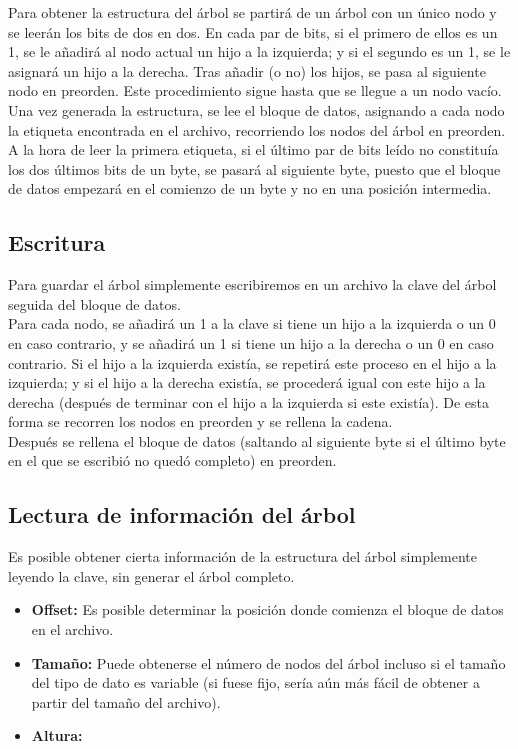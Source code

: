 \documentclass{article}
\begin{document}
Para obtener la estructura del árbol se partirá de un árbol con un único nodo y se 
leerán los bits de dos en dos. En cada par de bits, si el primero de ellos es un
1, se le añadirá al nodo actual un hijo a la izquierda; y si el segundo es un 1,
se le asignará un hijo a la derecha. Tras añadir (o no) los hijos, se pasa al
siguiente nodo en preorden. Este procedimiento sigue hasta que se llegue a un nodo
vacío. \\

Una vez generada la estructura, se lee el bloque de datos, asignando a cada nodo la
etiqueta encontrada en el archivo, recorriendo los nodos del árbol en preorden. A
la hora de leer la primera etiqueta, si el último par de bits leído no constituía 
los dos últimos bits de un byte, se pasará al siguiente byte, puesto que el bloque 
de datos empezará en el comienzo de un byte y no en una posición intermedia.

\subsection{Escritura}

Para guardar el árbol simplemente escribiremos en un archivo la clave del árbol 
seguida del bloque de datos. \\

Para cada nodo, se añadirá un 1 a la clave si tiene un hijo a la izquierda o un 0
en caso contrario, y se añadirá un 1 si tiene un hijo a la derecha o un 0 en caso 
contrario. Si el hijo a la izquierda existía, se repetirá este proceso en el hijo
a la izquierda; y si el hijo a la derecha existía, se procederá igual con este hijo
a la derecha (después de terminar con el hijo a la izquierda si este existía). De
esta forma se recorren los nodos en preorden y se rellena la cadena. \\

Después se rellena el bloque de datos (saltando al siguiente byte si el último 
byte en el que se escribió no quedó completo) en preorden.

\subsection{Lectura de información del árbol}

Es posible obtener cierta información de la estructura del árbol simplemente 
leyendo la clave, sin generar el árbol completo.

\begin{itemize}
	\item \textbf{Offset:} Es posible determinar la posición donde comienza el 
	bloque de datos en el archivo. %
	\item \textbf{Tamaño:} Puede obtenerse el número de nodos del árbol incluso
	si el tamaño del tipo de dato es variable (si fuese fijo, sería aún más fácil 
	de obtener a partir del tamaño del archivo). %
	\item \textbf{Altura:} %
\end{itemize}
\end{document}
